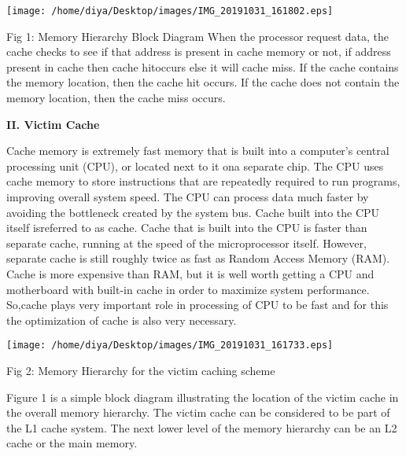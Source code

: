 \documentclass [ 12pt, letterpaper, twoside] {article}
\begin{document}
\texttt{[image: /home/diya/Desktop/images/IMG\_20191031\_161802.eps]}

Fig 1: Memory Hierarchy Block Diagram
When the processor request data, the cache checks to see if that address is present in cache memory or not, if address present in cache then cache hitoccurs else it will cache miss. If the cache contains the memory location, then the cache hit occurs. If the cache does not contain the memory location, then the cache miss occurs.

\textbf{\large II. Victim Cache }

Cache memory is extremely fast memory that is built into a computer’s central processing unit (CPU), or located next to it ona separate chip. The CPU uses cache memory to store instructions that are repeatedly required to run programs, improving overall system speed. The CPU can process data much faster by avoiding the bottleneck created by the system bus. Cache built into the CPU itself isreferred to as cache. Cache that is built into the CPU is faster than separate cache, running at the speed of the microprocessor itself. However, separate cache is still roughly twice as fast as Random Access Memory (RAM). Cache is more expensive than RAM, but it is well worth getting a CPU and motherboard with built-in cache in order to maximize system performance. So,cache plays very important role in processing of CPU to be fast and for this the optimization of cache is also very necessary. 

\texttt{[image: /home/diya/Desktop/images/IMG\_20191031\_161733.eps]}

Fig 2: Memory Hierarchy for the victim caching scheme

Figure 1 is a simple block diagram illustrating the location of the victim cache in the overall memory hierarchy. The victim cache can be considered to be part of the L1 cache system. The next lower level of the memory hierarchy can be an L2 cache or the main memory.
\end{document}
